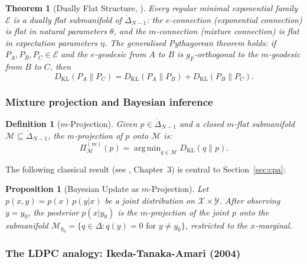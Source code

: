 \documentclass[referee,lineno,pdflatex,sn-mathphys-num]{sn-jnl}
\theoremstyle{thmstylethree}
\newtheorem{definition}{Definition}[section]
\theoremstyle{thmstyletwo}
\theoremstyle{thmstyleone}
\newtheorem{theorem}{Theorem}[section]
\newtheorem{proposition}{Proposition}[section]
\newcommand{\KL}{D_{\mathrm{KL}}}
\DeclareMathOperator*{\argmin}{arg\,min}
\begin{document}
\begin{theorem}[Dually Flat Structure, \cite{amari2000methods}]
\label{thm:dual-flat}
Every regular minimal exponential family $\mathcal{E}$ is a dually flat submanifold
of $\mathring{\Delta}_{N-1}$: the $e$-connection (exponential connection) is flat
in natural parameters $\theta$, and the $m$-connection (mixture connection)
is flat in expectation parameters $\eta$.
The generalised Pythagorean theorem holds: if $P_A,P_B,P_C\in\mathcal{E}$ and the
$e$-geodesic from $A$ to $B$ is $g_F$-orthogonal to the $m$-geodesic from $B$
to $C$, then
\begin{equation}\label{eq:pythagoras}
  \KL(P_A\|P_C) = \KL(P_A\|P_B) + \KL(P_B\|P_C).
\end{equation}
\end{theorem}

\subsubsection{Mixture projection and Bayesian inference}

\begin{definition}[$m$-Projection]\label{def:m-proj}
Given $p\in\mathring{\Delta}_{N-1}$ and a closed $m$-flat submanifold
$\mathcal{M}\subseteq\mathring{\Delta}_{N-1}$, the \emph{$m$-projection} of $p$ onto $\mathcal{M}$ is:
\begin{equation}\label{eq:m-proj}
  \Pi_\mathcal{M}^{(m)}(p) = \argmin_{q\in\mathcal{M}} \KL(q\|p).
\end{equation}
\end{definition}

The following classical result (see \cite{amari2000methods}, Chapter~3)
is central to Section~\ref{sec:cpa}:

\begin{proposition}[Bayesian Update as $m$-Projection]\label{prop:bayes-m}
Let $p(x,y) = p(x)\,p(y|x)$ be a joint distribution on $\mathcal{X}\times\mathcal{Y}$.
After observing $y=y_0$, the posterior $p(x|y_0)$ is the $m$-projection of
the joint $p$ onto the submanifold
$\mathcal{M}_{y_0} = \{q\in\Delta : q(y)=0 \text{ for } y\neq y_0\}$,
restricted to the $x$-marginal.
\end{proposition}

\subsubsection{The LDPC analogy: Ikeda-Tanaka-Amari (2004)}
\end{document}
